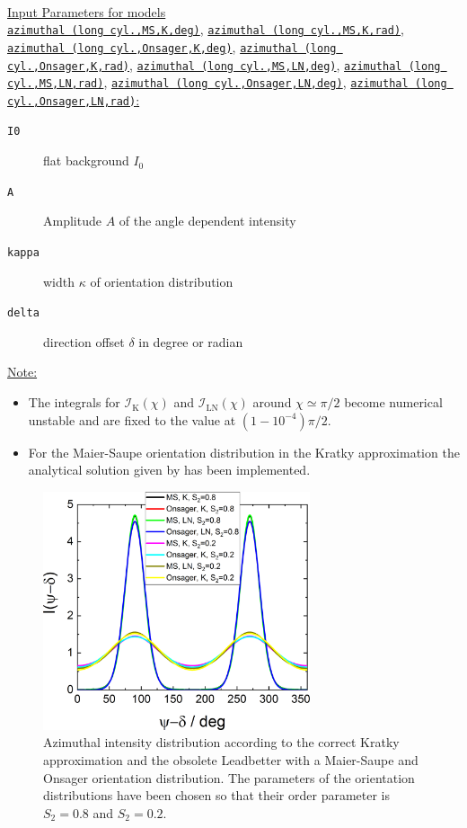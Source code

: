 \hspace{1pt}\\
\uline{Input Parameters for models} \\
\uline{\texttt{azimuthal (long cyl.,MS,K,deg)}}, \uline{\texttt{azimuthal (long cyl.,MS,K,rad)}}, \uline{\texttt{azimuthal (long cyl.,Onsager,K,deg)}}, \uline{\texttt{azimuthal (long cyl.,Onsager,K,rad)}}, \uline{\texttt{azimuthal (long cyl.,MS,LN,deg)}}, \uline{\texttt{azimuthal (long cyl.,MS,LN,rad)}}, \uline{\texttt{azimuthal (long cyl.,Onsager,LN,deg)}}, \uline{\texttt{azimuthal (long cyl.,Onsager,LN,rad)}:}\\
\begin{description}
\item[\texttt{I0}] flat background $I_0$
\item[\texttt{A}] Amplitude $A$ of the angle dependent intensity
\item[\texttt{kappa}] width $\kappa$ of orientation distribution
\item[\texttt{delta}] direction offset $\delta$ in degree or radian
\end{description}

\newpage
\noindent \uline{Note:}
\begin{itemize}
  \item The integrals for $\mathcal{I}_\mathrm{K}(\chi)$ and $\mathcal{I}_\mathrm{LN}(\chi)$ around $\chi\simeq\pi/2$ become numerical unstable and are fixed to the value at $(1-10^{-4})\pi/2$.
  \item For the Maier-Saupe orientation distribution in the Kratky approximation the analytical solution given by \cite{Mills2008} has been implemented.
\end{itemize}

\begin{figure}[htb]
\begin{center}
\includegraphics[width=0.7\textwidth]{../images/form_factor/azimuthal/azimuthal_long_cylinder.png}
\end{center}
\caption{Azimuthal intensity distribution according to the correct Kratky approximation and the obsolete Leadbetter with a Maier-Saupe and Onsager orientation distribution. The parameters of the orientation distributions have been chosen so that their order parameter is $S_2=0.8$ and $S_2=0.2$.}
\label{fig:azimuthal_long_cylinder}
\end{figure}

